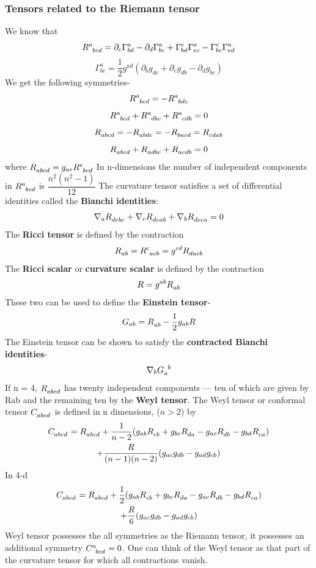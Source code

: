 \documentclass[12pt,a4paper]{article}
\numberwithin{table}{section}
\numberwithin{figure}{section}
\numberwithin{equation}{section}
\theoremstyle{remark}
\theoremstyle{definition}
\begin{document}
\subsubsection*{Tensors related to the Riemann tensor}
We know that
$$\tensor{R}{^{a}_{bcd}}=\partial_c\Gamma^a_{bd}-\partial_d\Gamma^a_{bc}+\Gamma^e_{bd}\Gamma^a_{ec}-\Gamma^e_{bc}\Gamma^a_{ed} $$
$$\Gamma^a_{bc}=\frac{1}{2}g^{ad}(\partial_bg_{dc}+\partial_cg_{db}-\partial_dg_{bc})$$
We get the following symmetries-
$$\tensor{R}{^{a}_{bcd}}=-\tensor{R}{^{a}_{bdc}} $$
$$\tensor{R}{^{a}_{bcd}}+\tensor{R}{^{a}_{dbc}}+\tensor{R}{^{a}_{cdb}}=0 $$
$$\tensor{R}{_{abcd}}=-\tensor{R}{_{abdc}}=-\tensor{R}{_{bacd}}=\tensor{R}{_{cdab}} $$
$$\tensor{R}{_{abcd}}+\tensor{R}{_{adbc}}+\tensor{R}{_{acdb}}= 0$$
where $\tensor{R}{_{abcd}}=g_{ae}\tensor{R}{^{e}_{bcd}}$
In n-dimensions the number of independent components in $\tensor{R}{^{a}_{bcd}}$ is $\dfrac{n^2(n^2-1)}{12}$
The curvature tensor satisfies a set of differential identities called the \textbf{Bianchi identities}:
$$\nabla_a \tensor{R}{_{debc}}+\nabla_c \tensor{R}{_{deab}}+\nabla_b \tensor{R}{_{deca}}=0 $$
The \textbf{Ricci tensor} is defined by the contraction
$$\tensor{R}{_{ab}}=\tensor{R}{^{c}_{acb}}=g^{cd}\tensor{R}{_{dacb}} $$
The \textbf{Ricci scalar} or \textbf{curvature scalar} is defined by the contraction
$$R=g^{ab}\tensor{R}{_{ab}}$$
These two can be used to define the \textbf{Einstein tensor}-
$$G_{ab}=\tensor{R}{_{ab}}-\frac{1}{2}g_{ab}R $$
The Einstein tensor can be shown to 
satisfy the \textbf{contracted Bianchi identities}-
$$\nabla_b \tensor{G}{_{a}^b} $$
If n = 4, $\tensor{R}{_{abcd}}$ has twenty independent components — ten of which are given by Rab and the remaining ten by the \textbf{Weyl tensor}. 
The Weyl tensor or conformal tensor $\tensor{C}{_{abcd}}$ is defined in n dimensions, ($n>2$) by
\begin{multline*}
\tensor{C}{_{abcd}} =\tensor{R}{_{abcd}}+\frac{1}{n-2}(g_{ab}\tensor{R}{_{cb}}+g_{bc}\tensor{R}{_{da}}-g_{ac}\tensor{R}{_{db}}-g_{bd}\tensor{R}{_{ca}}) \\
+\frac{R}{(n-1)(n-2)}(g_{ac}g_{db}-g_{ad}g_{cb})\\
\end{multline*}
In 4-d
\begin{multline*}
\tensor{C}{_{abcd}} =\tensor{R}{_{abcd}}+\frac{1}{2}(g_{ab}\tensor{R}{_{cb}}+g_{bc}\tensor{R}{_{da}}-g_{ac}\tensor{R}{_{db}}-g_{bd}\tensor{R}{_{ca}}) \\
+\frac{R}{6}(g_{ac}g_{db}-g_{ad}g_{cb})\\
\end{multline*}
Weyl tensor possesses the all symmetries as the Riemann tensor, it possesses an additional symmetry $\tensor{C}{^a_{bcd}}=0 $. One can think of the Weyl tensor as that part of the curvature tensor for which all contractions vanish.
\end{document}
